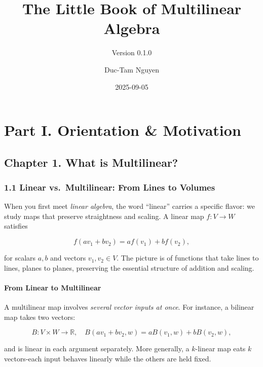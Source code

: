 \documentclass[
  letterpaper,
  DIV=11,
  numbers=noendperiod]{scrreprt}
\title{The Little Book of Multilinear Algebra}
\subtitle{Version 0.1.0}
\author{Duc-Tam Nguyen}
\date{2025-09-05}
\renewcommand*\contentsname{Table of contents}
\newcommand\contentsname{Table of contents}
\begin{document}
\maketitle

\renewcommand*\contentsname{Table of contents}
{
\hypersetup{linkcolor=}
\setcounter{tocdepth}{2}
\tableofcontents
}


\chapter{Part I. Orientation \&
Motivation}\label{part-i.-orientation-motivation}

\section{Chapter 1. What is
Multilinear?}\label{chapter-1.-what-is-multilinear}

\subsection{1.1 Linear vs.~Multilinear: From Lines to
Volumes}\label{linear-vs.-multilinear-from-lines-to-volumes}

When you first meet \emph{linear algebra}, the word ``linear'' carries a
specific flavor: we study maps that preserve straightness and scaling. A
linear map \(f: V \to W\) satisfies

\[
f(a v_1 + b v_2) = a f(v_1) + b f(v_2),
\]

for scalars \(a, b\) and vectors \(v_1, v_2 \in V\). The picture is of
functions that take lines to lines, planes to planes, preserving the
essential structure of addition and scaling.

\subsubsection{From Linear to
Multilinear}\label{from-linear-to-multilinear}

A multilinear map involves \emph{several vector inputs at once}. For
instance, a bilinear map takes two vectors:

\[
B : V \times W \to \mathbb{R}, \quad B(av_1 + bv_2, w) = a B(v_1, w) + b B(v_2, w),
\]

and is linear in each argument separately. More generally, a
\(k\)-linear map eats \(k\) vectors-each input behaves linearly while
the others are held fixed.
\end{document}
